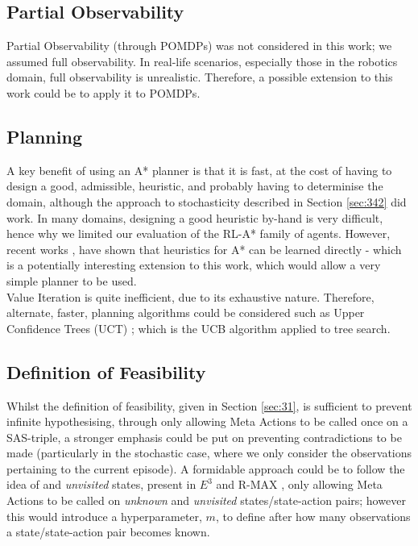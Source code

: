 \subsection{Partial Observability}
Partial Observability (through POMDPs) was not considered in this work; we assumed full observability. In real-life scenarios, especially those in the robotics domain, full observability is unrealistic. Therefore, a possible extension to this work could be to apply it to POMDPs.
\subsection{Planning}
A key benefit of using an A* planner is that it is fast, at the cost of having to design a good, admissible, heuristic, and probably having to determinise the domain, although the approach to stochasticity described in Section \ref{sec:342} did work. In many domains, designing a good heuristic by-hand is very difficult, hence why we limited our evaluation of the RL-A* family of agents. However, recent works \cite{DBLP:journals/corr/abs-2107-02603}, have shown that heuristics for A* can be learned directly - which is a potentially interesting extension to this work, which would allow a very simple planner to be used.
\\Value Iteration is quite inefficient, due to its exhaustive nature. Therefore, alternate, faster, planning algorithms could be considered such as Upper Confidence Trees (UCT) \cite{10.1007/11871842_29}; which is the UCB algorithm \cite{auer2002finite} applied to tree search.

\cite{POHL1970193, nilsson1971problem}

\subsection{Definition of Feasibility}
Whilst the definition of feasibility, given in Section \ref{sec:31}, is sufficient to prevent infinite hypothesising, through only allowing Meta Actions to be called once on a SAS-triple, a stronger emphasis could be put on preventing contradictions to be made (particularly in the stochastic case, where we only consider the observations pertaining to the current episode). A formidable approach could be to follow the idea of  and \textit{unvisited} states, present in $E^3$ \cite{Kearns+Singh:2002} and R-MAX \cite{10.1162/153244303765208377}, only allowing Meta Actions to be called on \textit{unknown} and \textit{unvisited} states/state-action pairs; however this would introduce a hyperparameter, $m$, to define after how many observations a state/state-action pair becomes known.
